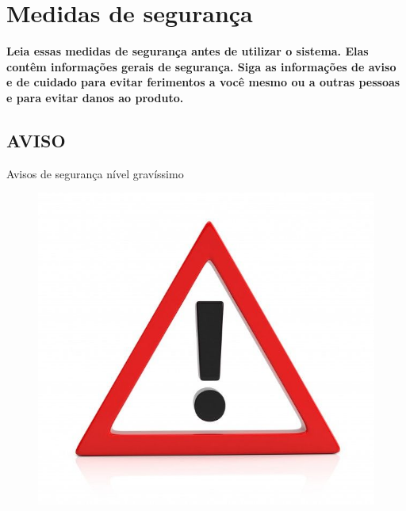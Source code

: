\chapter{Medidas de segurança}

\textbf{Leia essas medidas de segurança antes de utilizar o sistema. Elas contêm informações gerais de segurança. Siga as informações de aviso e de cuidado para evitar ferimentos a você mesmo ou a outras pessoas e para evitar danos ao produto.}

\section*{AVISO}

\begin{center}
 Avisos de segurança nível gravíssimo

\begin{figure}[H]
\centering
\includegraphics[scale = 0.2]{Figuras/aviso.png}
\end{figure}   
\end{center}


